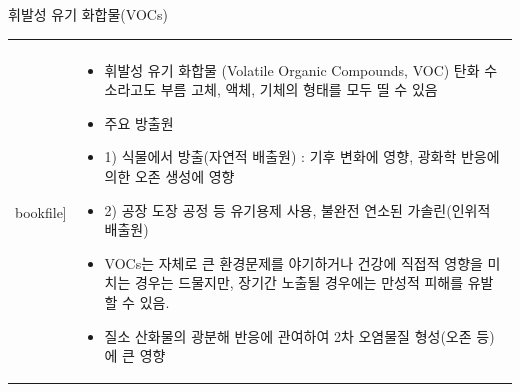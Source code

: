 \begin{frame}[t]{휘발성 유기 화합물(VOCs)}
	\begin{tabular}{ll}
		\begin{minipage}[t]{0.3\textwidth}\scriptsize
			\begin{figure}[t]
				\texttt{[image: \\bookfile]}
			\end{figure}
		\end{minipage}	
		&
		\begin{minipage}[t]{0.65\textwidth} \scriptsize	
			\begin{itemize}
				\item 휘발성 유기 화합물 (Volatile Organic Compounds, VOC) 탄화 수소라고도 부름
				고체, 액체, 기체의 형태를 모두 띨 수 있음
				\item 주요 방출원
				\item 1) 식물에서 방출(자연적 배출원) : 기후 변화에 영향, 광화학 반응에 의한 오존 생성에 영향 
				\item 2) 공장 도장 공정 등 유기용제 사용, 불완전 연소된 가솔린(인위적 배출원)
				\item VOCs는 자체로 큰 환경문제를 야기하거나 건강에 직접적 영향을 미치는 경우는 드물지만, 장기간 노출될 경우에는 만성적 피해를 유발할 수 있음.
				\item 질소 산화물의 광분해 반응에 관여하여 2차 오염물질 형성(오존 등)에 큰 영향
					
			\end{itemize}

		\end{minipage}
	\end{tabular}
\end{frame}




